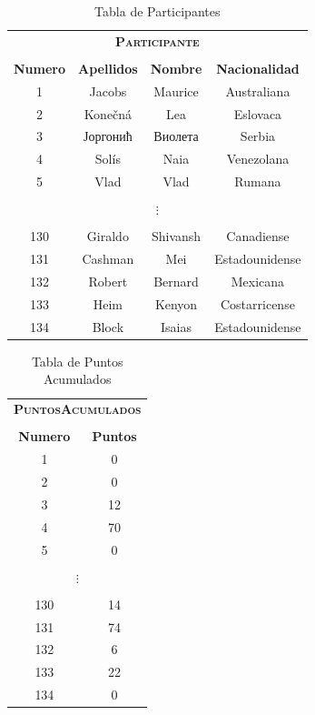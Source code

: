 \documentclass[a4paper, twoside, 12pt]{article}
\begin{document}
\begin{table}[H]
    \centering
    \begin{tabular}{|cccc|}
        \multicolumn{4}{c}{\bfseries{\scshape{Participante}}}\\
        \multicolumn{4}{c}{}\\\hline
        \textbf{Numero} &  \textbf{Apellidos} & \textbf{Nombre} & \textbf{Nacionalidad} \\\hline
         1 &	Jacobs   & Maurice &	Australiana\\
         2 &	Konečná  & Lea     &	Eslovaca\\
         3 &	Јоргонић & Виолета &	Serbia\\
         4 &	Solís    & Naia    &	Venezolana\\
         5 &	Vlad     & Vlad    &	Rumana\\
         \multicolumn{4}{|c|}{}\\
         \multicolumn{4}{|c|}{$\vdots$}\\
         \multicolumn{4}{|c|}{}\\
         130 &	Giraldo &	Shivansh &	Canadiense\\
         131 &	Cashman &	Mei      &   Estadounidense\\
         132 &	Robert  & Bernard  &   Mexicana\\
         133 &	Heim    &	Kenyon	  &   Costarricense\\
         134 &	Block	 & Isaias	  &   Estadounidense\\\hline
    \end{tabular}
    \caption{Tabla de Participantes}
    \label{tab:Participante}
\end{table}

\begin{table}[H]
    \centering
    \begin{tabular}{|cc|}
        \multicolumn{2}{c}{\bfseries{\scshape{PuntosAcumulados}}}\\
        \multicolumn{2}{c}{}\\\hline
        \textbf{Numero} &  \textbf{Puntos}\\\hline
         1 & 0	\\
         2 & 0	\\
         3 & 12 \\
         4 & 70	\\
         5 & 0	\\
         \multicolumn{2}{|c|}{}\\
         \multicolumn{2}{|c|}{$\vdots$}\\
         \multicolumn{2}{|c|}{}\\
         130 &	14 \\
         131 &	74 \\
         132 &	6 \\
         133 &	22 \\
         134 &	0 \\\hline
    \end{tabular}
    \caption{Tabla de Puntos Acumulados}
    \label{tab:Puntos}
\end{table}
\end{document}
